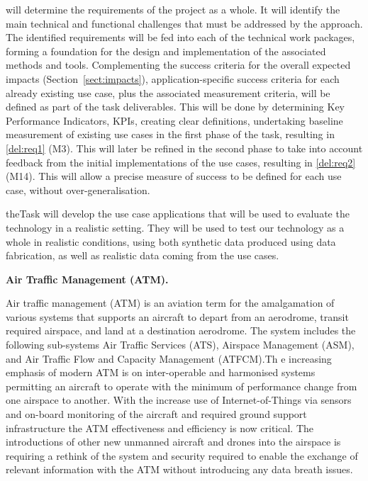 \begin{Workpackage}{\thewpno}
\begin{Task}
\TaskResults{%
}
\TaskHeader{}
\theTask{} will determine the requirements of the \TheProject{} project as a whole.  It will identify the main technical and functional challenges that must be addressed by the \TheProject{} approach. The identified  requirements will be fed into each of the technical work packages, forming a foundation for the design and implementation of the associated methods and tools. Complementing the success criteria for the overall expected impacts (Section~\ref{sect:impacts}), application-specific success criteria for each already existing use case, plus the associated measurement criteria, will be defined as part of the task deliverables. This will be done by determining Key Performance Indicators, KPIs, creating clear definitions, undertaking baseline measurement of existing use cases in the first phase of the task, resulting in \ref{del:req1} (M3). This will later be refined in the second phase to take into account feedback from the initial implementations of the use cases, resulting in \ref{del:req2} (M14). This will allow a precise measure of success to be defined for each use case, without over-generalisation.
\end{Task}

\begin{Task}
\TaskResults{%
}
\TaskHeader{}
theTask{} will develop the use case applications that will be used to evaluate the \TheProject{} technology in a realistic setting. They will be used to test our technology as a whole in realistic conditions, using both synthetic data produced using data fabrication, as well as realistic data coming from the use cases.

\textbf{Air Traffic Management (ATM).} 

Air traffic management (ATM) is an aviation term for the amalgamation of various systems that supports an aircraft to depart from an aerodrome, transit required airspace, and land at a destination aerodrome. The system includes the following sub-systems Air Traffic Services (ATS), Airspace Management (ASM), and Air Traffic Flow and Capacity Management (ATFCM).Th e increasing emphasis of modern ATM is on inter-operable and harmonised systems permitting an aircraft to operate with the minimum of performance change from one airspace to another. With the increase use of Internet-of-Things via sensors and on-board monitoring of the aircraft and required ground support infrastructure the ATM effectiveness and efficiency is now critical. The introductions of other new unmanned aircraft and drones into the airspace is requiring a rethink of the system and security required to enable the exchange of relevant information with the ATM without introducing any data breath issues.



\end{Task}
\end{Workpackage}
